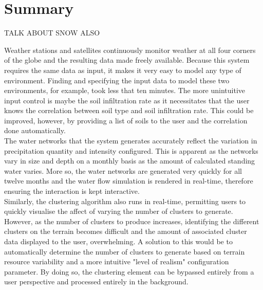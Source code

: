 \section{Summary}

TALK ABOUT SNOW ALSO

Weather stations and satellites continuously monitor weather at all four corners of the globe and the resulting data made freely available. Because this system requires the same data as input, it makes it very easy to model any type of environment. Finding and specifying the input data to model these two environments, for example, took less that ten minutes. The more unintuitive input control is maybe the soil infiltration rate as it necessitates that the user knows the correlation between soil type and soil infiltration rate. This could be improved, however, by providing a list of soils to the user and the correlation done automatically.\\

The water networks that the system generates accurately reflect the variation in precipitation quantity and intensity configured. This is apparent as the networks vary in size and depth on a monthly basis as the amount of calculated standing water varies. More so, the water networks are generated very quickly for all twelve months and the water flow simulation is rendered in real-time, therefore ensuring the interaction is kept interactive. \\

Similarly, the clustering algorithm also runs in real-time, permitting users to quickly visualise the affect of varying the number of clusters to generate. However, as the number of clusters to produce increases, identifying the different clusters on the terrain becomes difficult and the amount of associated cluster data displayed to the user, overwhelming. A solution to this would be to automatically determine the number of clusters to generate based on terrain resource variability and a more intuitive "level of realism" configuration parameter. By doing so, the clustering element can be bypassed entirely from a user perspective and processed entirely in the background.\\

